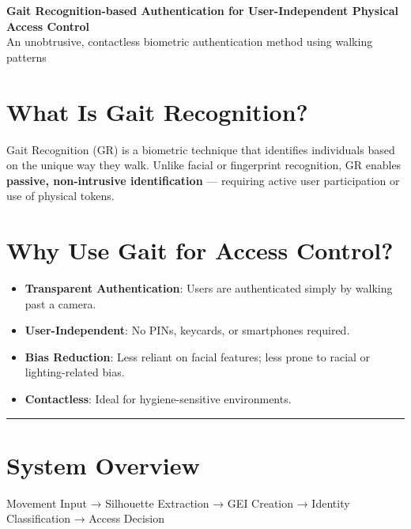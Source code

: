 \documentclass[a4paper,10pt]{article}
\begin{document}
\begin{center}
    {\LARGE \textbf{Gait Recognition-based Authentication for User-Independent Physical Access Control}}\\
    \vspace{0.5em}
    {\large An unobtrusive, contactless biometric authentication method using walking patterns}
\end{center}

\section*{What Is Gait Recognition?}
Gait Recognition (GR) is a biometric technique that identifies individuals based on the unique way they walk.
Unlike facial or fingerprint recognition, GR enables \textbf{passive, non-intrusive identification} — requiring active user participation or use of physical tokens.

\section*{Why Use Gait for Access Control?}
\begin{itemize}
    \item \textbf{Transparent Authentication}: Users are authenticated simply by walking past a camera.
    \item \textbf{User-Independent}: No PINs, keycards, or smartphones required.
    \item \textbf{Bias Reduction}: Less reliant on facial features; less prone to racial or lighting-related bias.
    \item \textbf{Contactless}: Ideal for hygiene-sensitive environments.
\end{itemize}

\vspace{0.5em}
\rule{\linewidth}{0.4pt}
\vspace{0.5em}

\section*{System Overview}

\vspace{0.5em}
\noindent
Movement Input → Silhouette Extraction → GEI Creation → Identity Classification → Access Decision
\end{document}
